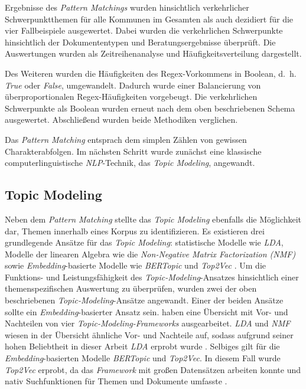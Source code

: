 

Ergebnisse des \textit{Pattern Matchings} wurden hinsichtlich verkehrlicher Schwerpunktthemen für alle Kommunen im Gesamten als auch dezidiert für die vier Fallbeispiele ausgewertet. Dabei wurden die verkehrlichen Schwerpunkte hinsichtlich der Dokumententypen und Beratungsergebnisse überprüft. Die Auswertungen wurden als Zeitreihenanalyse und Häufigkeitsverteilung dargestellt. 

Des Weiteren wurden die Häufigkeiten des Regex-Vorkommens in Boolean, d.~h. \textit{True} oder \textit{False}, umgewandelt. Dadurch wurde einer Balancierung von überproportionalen Regex-Häufigkeiten vorgebeugt. Die verkehrlichen Schwerpunkte als Boolean wurden erneut nach dem oben beschriebenen Schema ausgewertet. Abschließend wurden beide Methodiken verglichen.

Das \textit{Pattern Matching} entsprach dem simplen Zählen von gewissen Charakterabfolgen. Im nächsten Schritt wurde zunächst eine klassische computerlinguistische \textit{NLP}-Technik, das \textit{Topic Modeling}, angewandt.

\subsection{Topic Modeling}\label{sec:topic_modeling}

Neben dem \textit{Pattern Matching} stellte das \textit{Topic Modeling} ebenfalls die Möglichkeit dar, Themen innerhalb eines Korpus zu identifizieren. Es existieren drei grundlegende Ansätze für das \textit{Topic Modeling}: statistische Modelle wie \textit{LDA}, Modelle der linearen Algebra wie die \textit{Non-Negative Matrix Factorization (NMF)} sowie \textit{Embedding}-basierte Modelle wie \textit{BERTopic} und \textit{Top2Vec} \textcite[2]{egger2022}. Um die Funktions- und Leistungsfähigkeit des \textit{Topic-Modeling}-Ansatzes hinsichtlich einer themenspezifischen Auswertung zu überprüfen, wurden zwei der oben beschriebenen \textit{Topic-Modeling}-Ansätze angewandt. Einer der beiden Ansätze sollte ein \textit{Embedding}-basierter Ansatz sein. \textcite[13]{egger2022} haben eine Übersicht mit Vor- und Nachteilen von vier \textit{Topic-Modeling-Frameworks} ausgearbeitet. \textit{LDA} und \textit{NMF} wiesen in der Übersicht ähnliche Vor- und Nachteile auf, sodass aufgrund seiner hohen Beliebtheit in dieser Arbeit \textit{LDA} erprobt wurde \parencite[2]{egger2022}. Selbiges gilt für die \textit{Embedding}-basierten Modelle \textit{BERTopic} und \textit{Top2Vec}. In diesem Fall wurde \textit{Top2Vec} erprobt, da das \textit{Framework} mit großen Datensätzen arbeiten konnte und nativ Suchfunktionen für Themen und Dokumente umfasste \parencite[13]{egger2022}.

